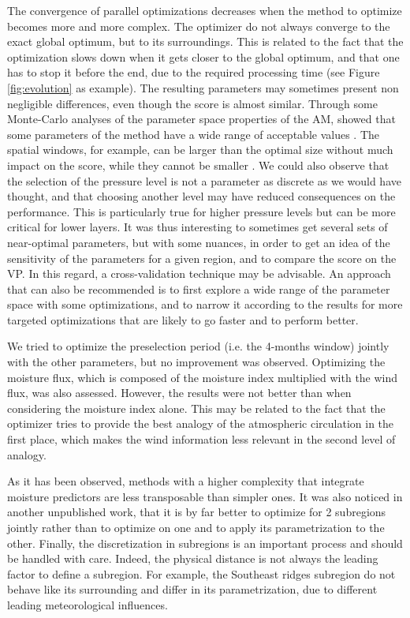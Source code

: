 \documentclass[review]{elsarticle}
\begin{document}
The convergence of parallel optimizations decreases when the method to optimize becomes more and more complex. The optimizer do not always converge to the exact global optimum, but to its surroundings. This is related to the fact that the optimization slows down when it gets closer to the global optimum, and that one has to stop it before the end, due to the required processing time (see Figure \ref{fig:evolution} as example). The resulting parameters may sometimes present non negligible differences, even though the score is almost similar. Through some Monte-Carlo analyses of the parameter space properties of the AM, \citet{Horton2012a} showed that some parameters of the method have a wide range of acceptable values \citep[see also][]{Horton2016}. The spatial windows, for example, can be larger than the optimal size without much impact on the score, while they cannot be smaller \citep[see also][]{Bontron2004}. We could also observe that the selection of the pressure level is not a parameter as discrete as we would have thought, and that choosing another level may have reduced consequences on the performance. This is particularly true for higher pressure levels but can be more critical for lower layers. It was thus interesting to sometimes get several sets of near-optimal parameters, but with some nuances, in order to get an idea of the sensitivity of the parameters for a given region, and to compare the score on the VP. In this regard, a cross-validation technique may be advisable. An approach that can also be recommended is to first explore a wide range of the parameter space with some optimizations, and to narrow it according to the results for more targeted optimizations that are likely to go faster and to perform better.

We tried to optimize the preselection period (i.e. the 4-months window) jointly with the other parameters, but no improvement was observed. Optimizing the moisture flux, which is composed of the moisture index multiplied with the wind flux, was also assessed. However, the results were not better than when considering the moisture index alone. This may be related to the fact that the optimizer tries to provide the best analogy of the atmospheric circulation in the first place, which makes the wind information less relevant in the second level of analogy.

As it has been observed, methods with a higher complexity that integrate moisture predictors are less transposable than simpler ones. It was also noticed in another unpublished work, that it is by far better to optimize for 2 subregions jointly rather than to optimize on one and to apply its parametrization to the other. Finally, the discretization in subregions is an important process and should be handled with care. Indeed, the physical distance is not always the leading factor to define a subregion. For example, the Southeast ridges subregion do not behave like its surrounding and differ in its parametrization, due to different leading meteorological influences.
\end{document}
